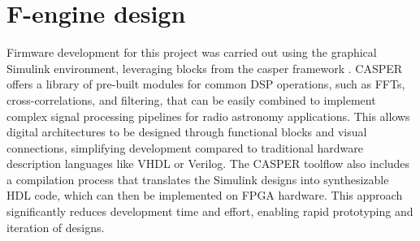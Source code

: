 \chapter{F-engine design}
Firmware development for this project was carried out using the graphical Simulink environment, leveraging blocks from the \gls{casper} framework \citep{hickish2016decadedevelopingradioastronomyinstrumentation}. CASPER offers a library of pre-built modules for common DSP operations, such as FFTs, cross-correlations, and filtering, that can be easily combined to implement complex signal processing pipelines for radio astronomy applications.
This allows digital architectures to be designed through functional blocks and visual connections, simplifying development compared to traditional hardware description languages like VHDL or Verilog. The CASPER toolflow also includes a compilation process that translates the Simulink designs into synthesizable HDL code, which can then be implemented on FPGA hardware. This approach significantly reduces development time and effort, enabling rapid prototyping and iteration of designs.